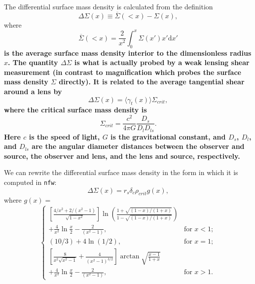 \documentclass[twocolumn]{aastex6}
\newcommand{\code}{\lstinline[style=codeintext]}
\begin{document}
The differential surface mass density is calculated from the definition
\begin{equation}\label{dsigma}
\Delta\Sigma(x) \equiv  \overline{\Sigma}(<x) - \Sigma(x),
\end{equation}
where
\begin{equation}\label{sigbar}
\overline{\Sigma}(<x) = \frac{2}{x^2} \int_0^{x} \Sigma(x') x' \mathrm{d}x'
\end{equation}
{\bf is the average surface mass density interior to the dimensionless radius $x$. The quantity $\Delta\Sigma$ is what is actually probed by a weak lensing shear measurement (in contrast to magnification which probes the surface mass density $\Sigma$ directly). It is related to the average tangential shear around a lens by}
\begin{equation}
\Delta\Sigma(x) = \langle \gamma_t(x) \rangle \Sigma_{crit},
\end{equation}
{\bf where the critical surface mass density is}
\begin{equation}
\Sigma_{crit} = \frac{c^2}{4 \pi G}\frac{D_s}{D_l D_{ls}}.
\end{equation}
{\bf Here $c$ is the speed of light, $G$ is the gravitational constant, and $D_s$, $D_l$, and $D_{ls}$ are the angular diameter distances between the observer and source, the observer and lens, and the lens and source, respectively.}

We can rewrite the differential surface mass density in the form in which it is computed in \code{nfw}:
\begin{equation}
     \Delta\Sigma(x) = r_s \delta_c \rho_{crit} g(x),
\end{equation}
where  $g(x) = $
\begin{equation}
    \begin{cases}

    \left[ \frac{4 / x^2 + 2/ (x^2 - 1)}{\sqrt{1 - x^2}} \right] \ln \left( \frac{1 + \sqrt{(1-x) / (1+x)} }{1 - \sqrt{(1-x) / (1+x)} } \right) \\ + \frac{4}{x^2} \ln \frac{x}{2} - \frac{2}{(x^2 - 1)}, & \text{for } x < 1; \\

    (10/3) + 4 \ln(1/2), & \text{for } x = 1; \\

    \left[ \frac{8}{x^2 \sqrt{x^2 - 1}} + \frac{4}{(x^2 - 1)^{3/2}} \right] \arctan\sqrt{\frac{x-1}{1+x}} \\ + \frac{4}{x^2} \ln \frac{x}{2} - \frac{2}{(x^2 - 1)}, & \text{for } x > 1.

    \end{cases}
\end{equation}
\end{document}
